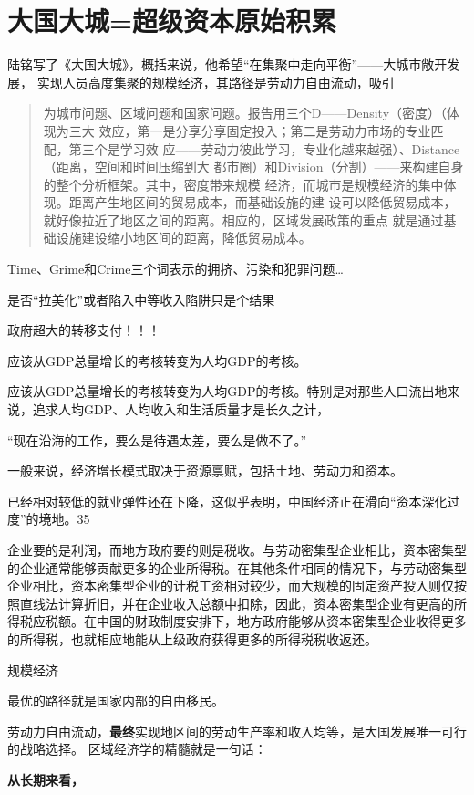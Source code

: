 \section{大国大城=超级资本原始积累}

陆铭写了《大国大城》，概括来说，他希望“在集聚中走向平衡”——大城市敞开发展，
实现人员高度集聚的规模经济，其路径是劳动力自由流动，吸引
\begin{quotation}
  为城市问题、区域问题和国家问题。报告用三个D——Density（密度）（体现为三大
  效应，第一是分享分享固定投入；第二是劳动力市场的专业匹配，第三个是学习效
  应——劳动力彼此学习，专业化越来越强）、Distance（距离，空间和时间压缩到大
  都市圈）和Division（分割）——来构建自身的整个分析框架。其中，密度带来规模
  经济，而城市是规模经济的集中体现。距离产生地区间的贸易成本，而基础设施的建
  设可以降低贸易成本，就好像拉近了地区之间的距离。相应的，区域发展政策的重点
  就是通过基础设施建设缩小地区间的距离，降低贸易成本。
\end{quotation}

Time、Grime和Crime三个词表示的拥挤、污染和犯罪问题…

是否“拉美化”或者陷入中等收入陷阱只是个结果

政府超大的转移支付！！！

应该从GDP总量增长的考核转变为人均GDP的考核。


应该从GDP总量增长的考核转变为人均GDP的考核。特别是对那些人口流出地来说，追求人均GDP、人均收入和生活质量才是长久之计，

“现在沿海的工作，要么是待遇太差，要么是做不了。”

一般来说，经济增长模式取决于资源禀赋，包括土地、劳动力和资本。

已经相对较低的就业弹性还在下降，这似乎表明，中国经济正在滑向“资本深化过度”的境地。35

企业要的是利润，而地方政府要的则是税收。与劳动密集型企业相比，资本密集型的企业通常能够贡献更多的企业所得税。在其他条件相同的情况下，与劳动密集型企业相比，资本密集型企业的计税工资相对较少，而大规模的固定资产投入则仅按照直线法计算折旧，并在企业收入总额中扣除，因此，资本密集型企业有更高的所得税应税额。在中国的财政制度安排下，地方政府能够从资本密集型企业收得更多的所得税，也就相应地能从上级政府获得更多的所得税税收返还。


规模经济

最优的路径就是国家内部的自由移民。

劳动力自由流动，{\bf 最终}实现地区间的劳动生产率和收入均等，是大国发展唯一可行的战略选择。
区域经济学的精髓就是一句话：

{\bf 从长期来看，}

